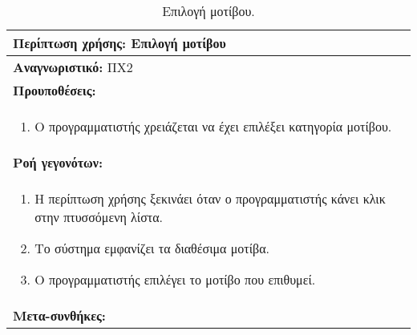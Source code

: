 \begin{table}[H]
	\hspace*{-0.2cm}
    \centering
    \scriptsize
	\begin{tabular}{|p{10cm}|}
	\hline
		\textbf{Περίπτωση χρήσης:} Επιλογή μοτίβου \\
	\hline
		\textbf{Αναγνωριστικό:} ΠΧ2 \\
	\hline	
		\textbf{Προυποθέσεις:} \\
		\begin{enumerate}
		 \item Ο προγραμματιστής χρειάζεται να έχει επιλέξει κατηγορία μοτίβου.
		\end{enumerate}\\
	\hline
		\textbf{Ροή γεγονότων:} \\
		\begin{enumerate}
			\item Η περίπτωση χρήσης ξεκινάει όταν ο προγραμματιστής κάνει κλικ στην πτυσσόμενη λίστα.
			\item Το σύστημα εμφανίζει τα διαθέσιμα μοτίβα.
		 	\item Ο προγραμματιστής επιλέγει το μοτίβο που επιθυμεί.
		\end{enumerate}\\
	\hline
		\textbf{Μετα-συνθήκες:} \\
	\hline
    \end{tabular}
    \caption{Επιλογή μοτίβου.}
    \label{tab:selectPatternUC}
\end{table}

